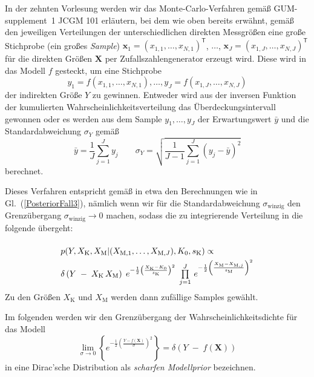 In der zehnten Vorlesung werden wir das Monte-Carlo-Verfahren gemäß GUM-supplement~1 JCGM 101
erläutern, bei dem wie oben bereits erwähnt,
gemäß den jeweiligen Ver\-teil\-ungen der unterschiedlichen direkten Messgrößen
eine große Stichprobe (ein großes \textsl{Sample}) 
$\mathbf{x}_1 = (x_{1,1},\dots,x_{N,1})^\mathsf{T}$, $\dots$, $\mathbf{x}_J = (x_{1,J},\dots,x_{N,J})^\mathsf{T}$
für die direkten Größen $\mathbf{X}$ per Zufallszahlengenerator erzeugt
wird. Diese wird in das Modell $f$ gesteckt,
um eine Stichprobe
\begin{equation}
y_1 = f(x_{1,1},\dots,x_{N,1}), \dots, y_J = f(x_{1,J},\dots,x_{N,J})
\end{equation}
der indirekten Größe $Y$ zu gewinnen. Entweder wird aus der inversen Funktion der kumulierten
Wahrscheinlichkeitsverteilung das Überdeckungsintervall gewonnen oder es werden aus dem Sample $y_1,\dots, y_J$
der Erwartungswert $\bar y$ und die Standardabweichung $\sigma_Y$ gemäß
$$
\bar y = \frac{1}{J} \sum_{j=1}^{J} y_j \qquad
\sigma_Y = \sqrt{\frac{1}{J-1} \sum_{j=1}^{J} (y_j - \bar y)^2}
$$
berechnet.

Dieses Verfahren entspricht gemäß \cite{Wue08} in etwa den Berechnungen wie
in Gl.~(\ref{PosteriorFall3}), nämlich wenn wir für die Standardabweichung $\sigma_\mathrm{winzig}$
den Grenzübergang $\sigma_\mathrm{winzig} \rightarrow 0$ machen, sodass die zu integrierende
Verteilung in die folgende übergeht:
\begin{equation}
\arraycolsep=2.0pt\def\arraystretch{2.0}
\begin{array}{l}
p(Y, X_\mathrm{K}, X_\mathrm{M} | (X_{\mathrm{M},1}, \dots, X_{\mathrm{M},J}), K_0, s_\mathrm{K}) \propto \\
\delta\left(Y \; - \; X_\mathrm{K} \, X_\mathrm{M}\right)
\;  e^{-\frac{1}{2} \left(\frac{X_\mathrm{K} - K_0}{s_\mathrm{K}} \right)^2} \; \prod\limits_{j=1}^J  \,
e^{-\frac{1}{2} \left(\frac{ X_\mathrm{M} - X_{\mathrm{M},j} }{s_\mathrm{M}} \right)^2} 
\end{array}
\label{PosteriorFall4}
\end{equation}
Zu den Größen $X_\mathrm{K}$ und $X_\mathrm{M}$ werden dann zufällige
Samples gewählt.

Im folgenden werden wir den Grenzübergang der Wahrscheinlichkeitsdichte für das Modell
\begin{equation}
\lim_{\sigma \rightarrow 0} \left\{ e^{-\frac{1}{2} \left(\frac{Y-f(\mathbf{X})}{\sigma}\right)^2} \right\}
= \delta\left(Y \; - \;f(\mathbf{X})\right)
\end{equation}
in eine Dirac'sche Distribution als \textsl{scharfen Modellprior} bezeichnen.


